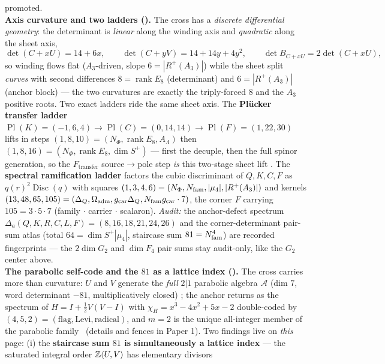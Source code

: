 \begin{winbox}
promoted.
\smallskip\\
\noindent\textbf{Axis curvature and two ladders ().} The cross has a
\emph{discrete differential geometry}: the determinant is \emph{linear} along the winding axis and
\emph{quadratic} along the sheet axis,
\[
  \det(C{+}xU)=14+6x,\qquad \det(C{+}yV)=14+14y+4y^2,\qquad \det B_{C+xU}=2\det(C{+}xU),
\]
so winding flows flat ($A_3$-driven, slope $6=|R^+(A_3)|$) while the sheet split \emph{curves} with second
differences $8=\operatorname{rank}E_8$ (determinant) and $6=|R^+(A_3)|$ (anchor block) --- the two curvatures
are exactly the triply-forced $8$ and the $A_3$ positive roots. Two exact ladders ride the same sheet axis.
The \textbf{Pl\"ucker transfer ladder} $\operatorname{Pl}(K)=({-}1,6,4)\to\operatorname{Pl}(C)=(0,14,14)\to
\operatorname{Pl}(F)=(1,22,30)$ lifts in steps $(1,8,10)=(N_\Phi,\operatorname{rank}E_8,A_\Lambda)$ then
$(1,8,16)=(N_\Phi,\operatorname{rank}E_8,\dim S^+)$ --- first the decuple, then the full spinor generation, so
the $F_{\mathrm{transfer}}$ source$\to$pole step \emph{is} this two-stage sheet lift \mC. The \textbf{spectral
ramification ladder} factors the cubic discriminant of $Q,K,C,F$ as $q(r)^2\operatorname{Disc}(q)$ with squares
$(1,3,4,6)=(N_\Phi,N_{\mathrm{fam}},|\mu_4|,|R^+(A_3)|)$ and kernels $(13,48,65,105)=(\Delta_Q,\Omega_{\mathrm{adm}},
g_{\mathrm{car}}\Delta_Q,N_{\mathrm{fam}}g_{\mathrm{car}}\cdot7)$, the corner $F$ carrying $105=3{\cdot}5{\cdot}7$ (family $\cdot$ carrier
$\cdot$ scalaron). \emph{Audit:} the anchor-defect spectrum $\Delta_a(Q,K,R,C,L,F)=(8,16,18,21,24,26)$ and the
corner-determinant pair-sum atlas (total $64=\dim S^+|\mu_4|$, staircase sum $81=N_{\mathrm{fam}}^4$) are recorded
fingerprints --- the $2\dim G_2$ and $\dim F_4$ pair sums stay audit-only, like the $G_2$ center above.
\smallskip\\
\noindent\textbf{The parabolic self-code and the $81$ as a lattice index
().} The cross carries more than curvature: $U$ and $V$
generate the \emph{full} $2|1$ parabolic algebra $\mathcal A$ (dim $7$, word determinant $-81$,
multiplicatively closed) \mE; the anchor returns as the spectrum of $H=I+\tfrac12V(V-I)$ with
$\chi_H=x^3-4x^2+5x-2$ double-coded by $(4,5,2)=(\text{flag},\text{Levi},\text{radical})$, and $m=2$
is the unique all-integer member of the parabolic family \mE\ (details and fences in Paper 1).  Two
findings live on \emph{this} page: (i) the \textbf{staircase sum $81$ is simultaneously a lattice
index} --- the saturated integral order $\mathbb{Z}\langle U,V\rangle$ has elementary divisors

\end{winbox}
